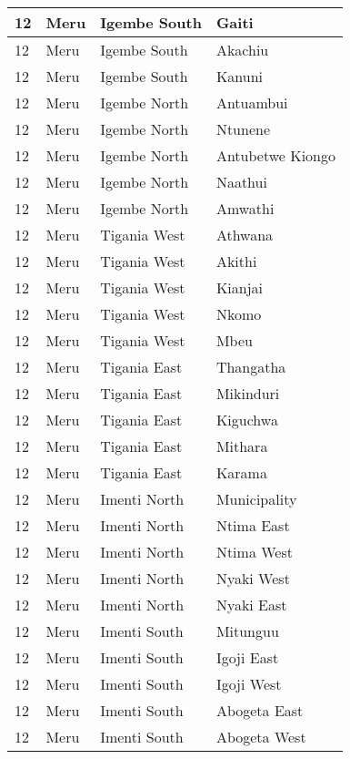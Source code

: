 \begin{table}[!ht]
\begin{tabular}{|l|l|l|l|}
        12 & Meru & Igembe South & Gaiti \\ \hline
        12 & Meru & Igembe South & Akachiu \\ \hline
        12 & Meru & Igembe South & Kanuni \\ \hline
        12 & Meru & Igembe North & Antuambui \\ \hline
        12 & Meru & Igembe North & Ntunene \\ \hline
        12 & Meru & Igembe North & Antubetwe Kiongo \\ \hline
        12 & Meru & Igembe North & Naathui \\ \hline
        12 & Meru & Igembe North & Amwathi \\ \hline
        12 & Meru & Tigania West & Athwana \\ \hline
        12 & Meru & Tigania West & Akithi \\ \hline
        12 & Meru & Tigania West & Kianjai \\ \hline
        12 & Meru & Tigania West & Nkomo \\ \hline
        12 & Meru & Tigania West & Mbeu \\ \hline
        12 & Meru & Tigania East & Thangatha \\ \hline
        12 & Meru & Tigania East & Mikinduri \\ \hline
        12 & Meru & Tigania East & Kiguchwa \\ \hline
        12 & Meru & Tigania East & Mithara \\ \hline
        12 & Meru & Tigania East & Karama \\ \hline
        12 & Meru & Imenti North & Municipality \\ \hline
        12 & Meru & Imenti North & Ntima East \\ \hline
        12 & Meru & Imenti North & Ntima West \\ \hline
        12 & Meru & Imenti North & Nyaki West \\ \hline
        12 & Meru & Imenti North & Nyaki East \\ \hline
        12 & Meru & Imenti South & Mitunguu \\ \hline
        12 & Meru & Imenti South & Igoji East \\ \hline
        12 & Meru & Imenti South & Igoji West \\ \hline
        12 & Meru & Imenti South & Abogeta East \\ \hline
        12 & Meru & Imenti South & Abogeta West \\ \hline

\end{tabular}
\end{table}
